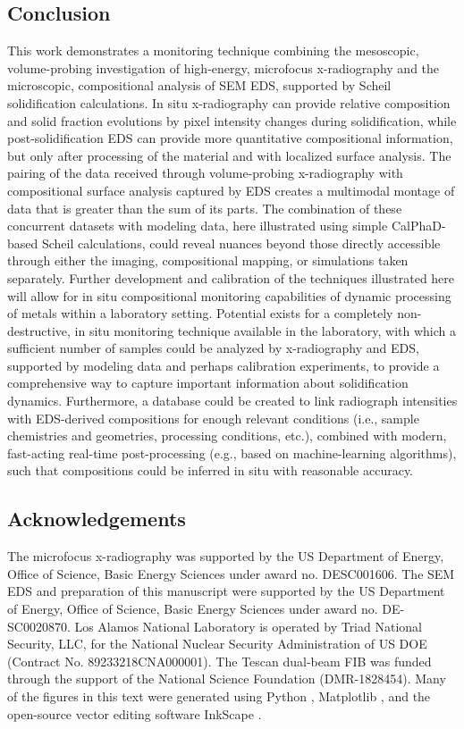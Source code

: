 \subsection{Conclusion}
This work demonstrates a monitoring technique combining the mesoscopic,
volume-probing investigation of high-energy, microfocus x-radiography and
the microscopic, compositional analysis of SEM EDS, supported by Scheil
solidification calculations. In situ x-radiography can provide relative
composition and solid fraction evolutions by pixel intensity changes
during solidification, while post-solidification EDS can provide more
quantitative compositional information, but only after processing of the
material and with localized surface analysis. The pairing of the data
received through volume-probing x-radiography with compositional surface
analysis captured by EDS creates a multimodal montage of data that is
greater than the sum of its parts. The combination of these concurrent
datasets with modeling data, here illustrated using simple CalPhaD-based
Scheil calculations, could reveal nuances beyond those directly accessible
through either the imaging, compositional mapping, or simulations taken
separately. Further development and calibration of the techniques
illustrated here will allow for in situ compositional monitoring
capabilities of dynamic processing of metals within a laboratory setting.
Potential exists for a completely non-destructive, in situ monitoring
technique available in the laboratory, with which a sufficient number of
samples could be analyzed by x-radiography and EDS, supported by modeling
data and perhaps calibration experiments, to provide a comprehensive way
to capture important information about solidification dynamics.
Furthermore, a database could be created to link radiograph intensities
with EDS-derived compositions for enough relevant conditions (i.e., sample
chemistries and geometries, processing conditions, etc.), combined with
modern, fast-acting real-time post-processing (e.g., based on
machine-learning algorithms), such that compositions could be inferred in
situ with reasonable accuracy.

\subsection*{Acknowledgements}
The microfocus x-radiography was supported by
the US Department of Energy, Office of Science,
Basic Energy Sciences under award no. DESC001606.
The SEM EDS and preparation of this
manuscript were supported by the US Department
of Energy, Office of Science, Basic Energy Sciences
under award no. DE-SC0020870.
Los Alamos National Laboratory is operated by Triad National
Security, LLC, for the National Nuclear Security
Administration of US DOE (Contract No. 89233218CNA000001).
The Tescan dual-beam FIB was funded through the support of the National
Science Foundation (DMR-1828454). Many of the
figures in this text were generated using Python \cite{python},
Matplotlib \cite{matplotlib}, and the open-source vector editing
software InkScape \cite{inkscape}.

